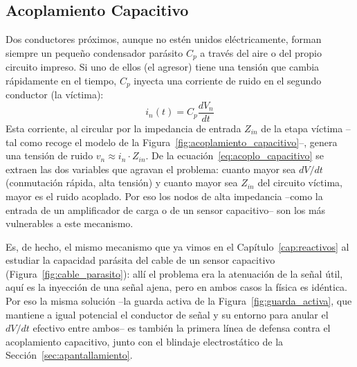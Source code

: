 \subsection{Acoplamiento Capacitivo}\label{sub:acoplamiento_capacitivo}

Dos conductores próximos, aunque no estén unidos eléctricamente, forman siempre un pequeño condensador parásito $C_p$ a través del aire o del propio circuito impreso. Si uno de ellos (el agresor) tiene una tensión que cambia rápidamente en el tiempo, $C_p$ inyecta una corriente de ruido en el segundo conductor (la víctima):
\begin{equation}\label{eq:acoplo_capacitivo}
    i_n(t) = C_p \frac{dV_n}{dt}
\end{equation}
Esta corriente, al circular por la impedancia de entrada $Z_{in}$ de la etapa víctima --tal como recoge el modelo de la Figura~\ref{fig:acoplamiento_capacitivo}--, genera una tensión de ruido $v_n \approx i_n \cdot Z_{in}$. De la ecuación~\eqref{eq:acoplo_capacitivo} se extraen las dos variables que agravan el problema: cuanto mayor sea $dV/dt$ (conmutación rápida, alta tensión) y cuanto mayor sea $Z_{in}$ del circuito víctima, mayor es el ruido acoplado. Por eso los nodos de alta impedancia --como la entrada de un amplificador de carga o de un sensor capacitivo-- son los más vulnerables a este mecanismo.

\begin{marginfigure}
    \centering
    \shorthandoff{>}
    \caption[Modelo del acoplamiento capacitivo.]{Modelo del acoplamiento capacitivo. La capacidad parásita $C_p$ entre el conductor agresor y la línea víctima inyecta una corriente $i_n$ proporcional a $dV_n/dt$, que se convierte en tensión de ruido al circular por $Z_{in}$.}\label{fig:acoplamiento_capacitivo}
\end{marginfigure}

Es, de hecho, el mismo mecanismo que ya vimos en el Capítulo~\ref{cap:reactivos} al estudiar la capacidad parásita del cable de un sensor capacitivo (Figura~\ref{fig:cable_parasito}): allí el problema era la atenuación de la señal útil, aquí es la inyección de una señal ajena, pero en ambos casos la física es idéntica. Por eso la misma solución --la guarda activa de la Figura~\ref{fig:guarda_activa}, que mantiene a igual potencial el conductor de señal y su entorno para anular el $dV/dt$ efectivo entre ambos-- es también la primera línea de defensa contra el acoplamiento capacitivo, junto con el blindaje electrostático de la Sección~\ref{sec:apantallamiento}.

